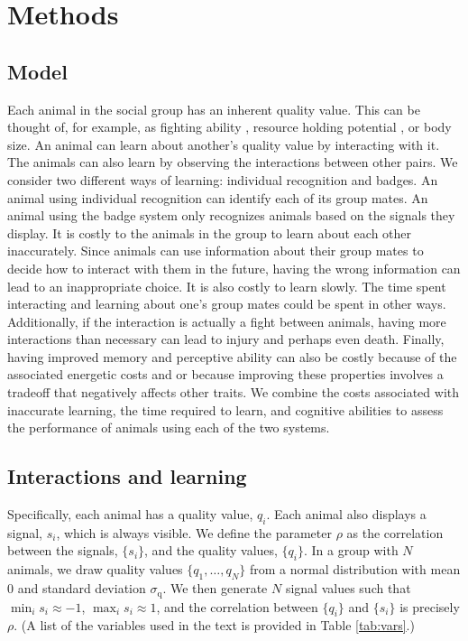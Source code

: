 \section*{Methods} 
%
\subsection*{Model}
%
Each animal in the social group has an inherent quality value. This can be thought of, for example, as fighting ability \cite{}, resource holding potential \cite{}, or body size. An animal can learn about another's quality value by interacting with it. The animals can also learn by observing the interactions between other pairs. We consider two different ways of learning: individual recognition and badges. An animal using individual recognition can identify each of its group mates. An animal using the badge system only recognizes animals based on the signals they display. It is costly to the animals in the group to learn about each other inaccurately. Since animals can use information about their group mates to decide how to interact with them in the future, having the wrong information can lead to an inappropriate choice. It is also costly to learn slowly. The time spent interacting and learning about one's group mates could be spent in other ways. Additionally, if the interaction is actually a fight between animals, having more interactions than necessary can lead to injury and perhaps even death. Finally, having improved memory and perceptive ability can also be costly because of the associated energetic costs and or because improving these properties involves a tradeoff that negatively affects other traits. We combine the costs associated with inaccurate learning, the time required to learn, and cognitive abilities to assess the performance of animals using each of the two systems. 

\subsection{Interactions and learning }
Specifically, each animal has a quality value, $q_i$. Each animal also displays a signal, $s_i$, which is always visible. We define the parameter $\rho$ as the correlation between the signals, $\{s_i\}$, and the quality values, $\{q_i\}$. In a group with $N$ animals, we draw quality values $\{q_1,\dots,q_N\}$ from a normal distribution with mean $0$ and standard deviation $\sigma_\text{q}$. We then generate $N$ signal values such that $\min_i{s_i}\approx -1$, $\max_i{s_i}\approx 1$, and the correlation between $\{q_i\}$ and $\{s_i\}$ is precisely $\rho$. (A list of the variables used in the text is provided in Table \ref{tab:vars}.)
  
